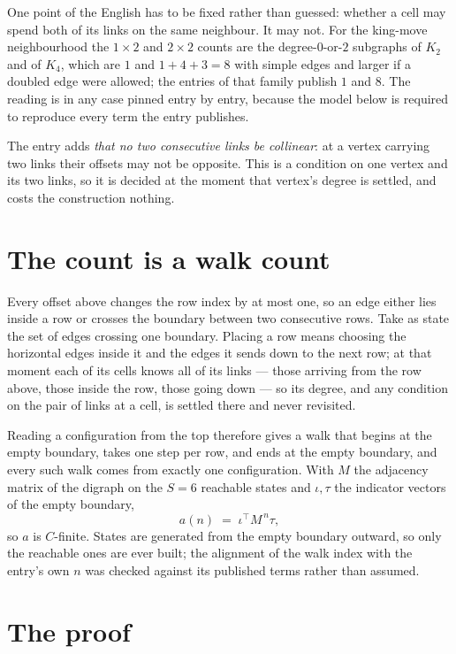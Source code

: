 \documentclass[11pt,a4paper]{article}
\theoremstyle{plain}
\theoremstyle{definition}
\begin{document}
One point of the English has to be fixed rather than guessed: whether a cell may spend both of
its links on the same neighbour. It may not. For the king-move neighbourhood the $1\times2$
and $2\times2$ counts are the degree-$0$-or-$2$ subgraphs of $K_2$ and of $K_4$, which are $1$
and $1+4+3=8$ with simple edges and larger if a doubled edge were allowed; the entries of that
family publish $1$ and $8$. The reading is in any case pinned entry by entry, because the
model below is required to reproduce every term the entry publishes.

The entry adds \emph{that no two consecutive links be collinear}: at a vertex carrying two
links their offsets may not be opposite. This is a condition on one vertex and its two links,
so it is decided at the moment that vertex's degree is settled, and costs the construction
nothing.

\section{The count is a walk count}

Every offset above changes the row index by at most one, so an edge either lies inside a row
or crosses the boundary between two consecutive rows. Take as state the set of edges crossing
one boundary. Placing a row means choosing the horizontal edges inside it and the edges it
sends down to the next row; at that moment each of its cells knows all of its links --- those
arriving from the row above, those inside the row, those going down --- so its degree, and any
condition on the pair of links at a cell, is settled there and never revisited.

Reading a configuration from the top therefore gives a walk that begins at the empty boundary,
takes one step per row, and ends at the empty boundary, and every such walk comes from exactly
one configuration. With $M$ the adjacency matrix of the digraph on the $S=6$ reachable
states and $\iota,\tau$ the indicator vectors of the empty boundary,
\[
a(n)\;=\;\iota^{\!\top}M^{\,n}\tau ,
\]
so $a$ is $C$-finite. States are generated from the empty boundary outward, so only the
reachable ones are ever built; the alignment of the walk index with the entry's own $n$ was
checked against its published terms rather than assumed.

\section{The proof}
\end{document}

